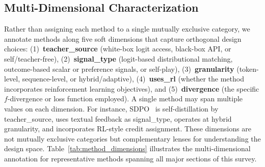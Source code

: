\documentclass{article} %
\begin{document}
\subsection{Multi-Dimensional Characterization}
\label{subsec:multi_dim}

Rather than assigning each method to a single mutually exclusive category, we annotate methods along five soft dimensions that capture orthogonal design choices: (1)~\textbf{teacher\_source} (white-box logit access, black-box API, or self/teacher-free), (2)~\textbf{signal\_type} (logit-based distributional matching, outcome-based scalar or preference signals, or self-play), (3)~\textbf{granularity} (token-level, sequence-level, or hybrid/adaptive), (4)~\textbf{uses\_rl} (whether the method incorporates reinforcement learning objectives), and (5)~\textbf{divergence} (the specific $f$-divergence or loss function employed). A single method may span multiple values on each dimension. For instance, SDPO~\citep{2601.20802} is self-distillation by teacher\_source, uses textual feedback as signal\_type, operates at hybrid granularity, and incorporates RL-style credit assignment. These dimensions are not mutually exclusive categories but complementary lenses for understanding the design space. Table~\ref{tab:method_dimensions} illustrates the multi-dimensional annotation for representative methods spanning all major sections of this survey.
\end{document}
